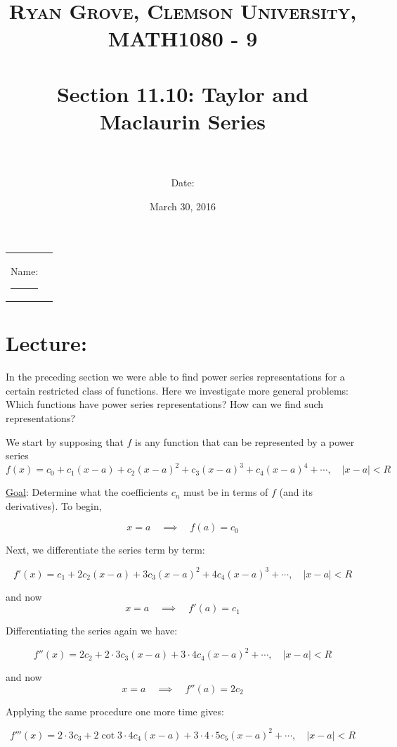\documentclass[paper=a4, fontsize=11pt]{scrartcl} %
\title{	
\normalfont \normalsize 
\textsc{Ryan Grove, Clemson University, MATH1080 - 9} \\ [25pt] %
\horrule{0.5pt} \\[0.4cm] %
\huge Section 11.10: Taylor and Maclaurin Series\\ %
\horrule{2pt} \\[0.5cm] %
}
\author{Date:} %
\date{\normalsize March 30, 2016} %
\numberwithin{equation}{section} %
\numberwithin{figure}{section} %
\numberwithin{table}{section} %
\begin{document}
\maketitle %

\begin{flushleft}
\begin{tabular}{l l}
Name: \rule{3.2in}{.01cm}  & {}%
\end{tabular}
\end{flushleft}


\section*{\textbf{Lecture:}}
In the preceding section we were able to find power series representations for a certain restricted class of functions. Here we investigate more general problems: Which functions have power series representations? How can we find such representations?\\
\indent

We start by supposing that $f$ is any function that can be represented by a power series
\[f(x) = c_0 + c_1(x-a) + c_2(x-a)^2 + c_3(x-a)^3 + c_4(x-a)^4 + \cdots, \quad |x-a| < R\]
\indent

\underline{Goal}: Determine what the coefficients $c_n$ must be in terms of $f$ (and its derivatives). To begin,

\[x=a \quad \implies \quad f(a) = c_0\]

Next, we differentiate the series term by term:

\[f'(x) = c_1 + 2c_2(x-a) + 3c_3(x-a)^2 + 4c_4(x-a)^3 + \cdots, \quad |x-a|<R \]

and now
\[x=a \quad \implies \quad f'(a) = c_1\]

Differentiating the series again we have:

\[f''(x) = 2c_2 + 2\cdot 3 c_3 (x-a) + 3\cdot 4 c_4 (x-a)^2 + \cdots, \quad |x-a|<R\]

and now
\[x=a \quad \implies \quad f''(a) = 2c_2\]

Applying the same procedure one more time gives:

\[f'''(x) = 2\cdot 3 c_3 + 2\cot 3 \cdot 4 c_4 (x-a) + 3\cdot 4 \cdot 5 c_5 (x-a)^2 + \cdots, \quad |x-a|<R\]
\end{document}
